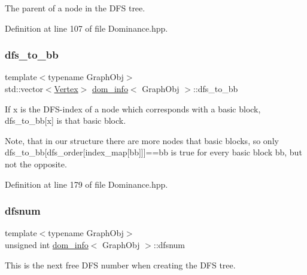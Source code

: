 The parent of a node in the D\+FS tree. 



Definition at line 107 of file Dominance.\+hpp.

\mbox{\label{classdom__info_a082a53aee1546ad2eacc3424402a037c}} 
\subsubsection{\texorpdfstring{dfs\+\_\+to\+\_\+bb}{dfs\_to\_bb}}
{\footnotesize\ttfamily template$<$typename Graph\+Obj$>$ \\
std\+::vector$<$\hyperlink{classdom__info_a5e4ca21e2c5281bdbb95d2c8d965c9be}{Vertex}$>$ \hyperlink{classdom__info}{dom\+\_\+info}$<$ Graph\+Obj $>$\+::dfs\+\_\+to\+\_\+bb\hspace{0.3cm}{\ttfamily [private]}}



If x is the D\+F\+S-\/index of a node which corresponds with a basic block, dfs\+\_\+to\+\_\+bb\mbox{[}x\mbox{]} is that basic block. 

Note, that in our structure there are more nodes that basic blocks, so only dfs\+\_\+to\+\_\+bb\mbox{[}dfs\+\_\+order\mbox{[}index\+\_\+map\mbox{[}bb\mbox{]}\mbox{]}\mbox{]}==bb is true for every basic block bb, but not the opposite. 

Definition at line 179 of file Dominance.\+hpp.

\mbox{\label{classdom__info_afc75734433482656d0252c7faca9c67b}} 
\subsubsection{\texorpdfstring{dfsnum}{dfsnum}}
{\footnotesize\ttfamily template$<$typename Graph\+Obj$>$ \\
unsigned int \hyperlink{classdom__info}{dom\+\_\+info}$<$ Graph\+Obj $>$\+::dfsnum\hspace{0.3cm}{\ttfamily [private]}}



This is the next free D\+FS number when creating the D\+FS tree. 



